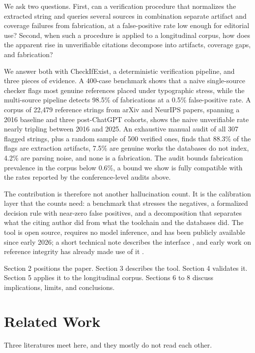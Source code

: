 \documentclass[11pt, a4paper]{article}
\begin{document}
We ask two questions. First, can a verification procedure that normalizes the extracted string and queries several sources in combination separate artifact and coverage failures from fabrication, at a false-positive rate low enough for editorial use? Second, when such a procedure is applied to a longitudinal corpus, how does the apparent rise in unverifiable citations decompose into artifacts, coverage gaps, and fabrication?

We answer both with CheckIfExist, a deterministic verification pipeline, and three pieces of evidence. A 400-case benchmark shows that a naive single-source checker flags most genuine references placed under typographic stress, while the multi-source pipeline detects 98.5\% of fabrications at a 0.5\% false-positive rate. A corpus of 22{,}479 reference strings from arXiv and NeurIPS papers, spanning a 2016 baseline and three post-ChatGPT cohorts, shows the naive unverifiable rate nearly tripling between 2016 and 2025. An exhaustive manual audit of all 307 flagged strings, plus a random sample of 500 verified ones, finds that 88.3\% of the flags are extraction artifacts, 7.5\% are genuine works the databases do not index, 4.2\% are parsing noise, and none is a fabrication. The audit bounds fabrication prevalence in the corpus below 0.6\%, a bound we show is fully compatible with the rates reported by the conference-level audits above.

The contribution is therefore not another hallucination count. It is the calibration layer that the counts need: a benchmark that stresses the negatives, a formalized decision rule with near-zero false positives, and a decomposition that separates what the citing author did from what the toolchain and the databases did. The tool is open source, requires no model inference, and has been publicly available since early 2026; a short technical note describes the interface \citep{abbonato2026}, and early work on reference integrity has already made use of it \citep{bianchini2025, gargiulo2026}.

Section 2 positions the paper. Section 3 describes the tool. Section 4 validates it. Section 5 applies it to the longitudinal corpus. Sections 6 to 8 discuss implications, limits, and conclusions.

\section{Related Work}
Three literatures meet here, and they mostly do not read each other.
\end{document}
